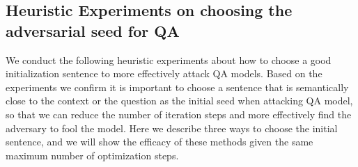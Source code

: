 

\subsection{Heuristic Experiments on choosing the adversarial seed for QA}
\label{appendix:heuristic}

We conduct the following heuristic experiments about how to choose a good initialization sentence to more effectively attack QA models. Based on the experiments we confirm it is important to choose a sentence that is semantically close to the context or the question as the initial seed when attacking QA model, so that we can reduce the number of iteration steps and more effectively find the adversary to fool the model. Here we describe three ways to choose the initial sentence, and we will show the efficacy of these methods given the same maximum number of optimization steps.

